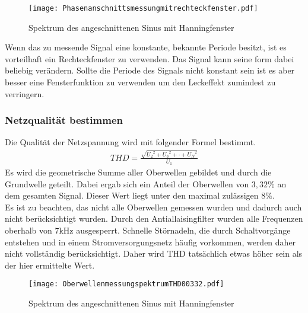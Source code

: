 \documentclass{article}%
\begin{document}
\begin{figure}[htb]
\centering
\texttt{[image: Phasenanschnittsmessungmitrechteckfenster.pdf]}
\caption{Spektrum des angeschnittenen Sinus mit Hanningfenster}
\end{figure} 
Wenn das zu messende Signal eine konstante, bekannte Periode besitzt, ist es vorteilhaft ein Rechteckfenster zu verwenden. Das Signal kann seine form dabei beliebig verändern. Sollte die Periode des Signals nicht konstant sein ist es aber besser eine Fensterfunktion zu verwenden um den Leckeffekt zumindest zu verringern.
\subsubsection{Netzqualität bestimmen}
Die Qualität der Netzspannung wird mit folgender Formel bestimmt.
\begin{align}
THD = \frac{\sqrt{{U_2}^2+{U_3}^2+ \cdot + {U_N}^2}}{U_1}
\end{align}   
Es wird die geometrische Summe aller Oberwellen gebildet und durch die Grundwelle geteilt.
Dabei ergab sich ein Anteil der Oberwellen von $3,32\%$ an dem gesamten Signal. Dieser Wert liegt unter den maximal zulässigen $8\%$.\\ Es ist zu beachten, das nicht alle Oberwellen gemessen wurden und dadurch auch nicht berücksichtigt wurden. Durch den Antiallaisingfilter wurden alle Frequenzen oberhalb von 7kHz ausgesperrt. Schnelle Störnadeln, die durch Schaltvorgänge entstehen und in einem Stromversorgungsnetz häufig vorkommen, werden daher nicht vollständig berücksichtigt. Daher wird THD tatsächlich etwas höher sein als der hier ermittelte Wert.
\begin{figure}[htb]
\centering
\texttt{[image: OberwellenmessungspektrumTHD00332.pdf]}
\caption{Spektrum des angeschnittenen Sinus mit Hanningfenster}
\end{figure}
\end{document}
